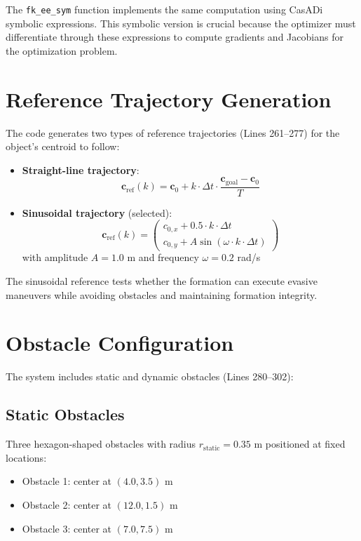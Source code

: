 \documentclass[12pt,a4paper]{article}
\begin{document}
The \texttt{fk\_ee\_sym} function implements the same computation using CasADi symbolic expressions. This symbolic version is crucial because the optimizer must differentiate through these expressions to compute gradients and Jacobians for the optimization problem.

\section{Reference Trajectory Generation}

The code generates two types of reference trajectories (Lines 261--277) for the object's centroid to follow:

\begin{itemize}
    \item \textbf{Straight-line trajectory}:
    \[
    \mathbf{c}_{\text{ref}}(k) = \mathbf{c}_0 + k \cdot \Delta t \cdot \frac{\mathbf{c}_{\text{goal}} - \mathbf{c}_0}{T}
    \]
    
    \item \textbf{Sinusoidal trajectory} (selected):
    \[
    \mathbf{c}_{\text{ref}}(k) = \begin{pmatrix} c_{0,x} + 0.5 \cdot k \cdot \Delta t \\ c_{0,y} + A \sin(\omega \cdot k \cdot \Delta t) \end{pmatrix}
    \]
    with amplitude $A = 1.0$ m and frequency $\omega = 0.2$ rad/s
\end{itemize}

The sinusoidal reference tests whether the formation can execute evasive maneuvers while avoiding obstacles and maintaining formation integrity.

\section{Obstacle Configuration}

The system includes static and dynamic obstacles (Lines 280--302):

\subsection{Static Obstacles}
Three hexagon-shaped obstacles with radius $r_{\text{static}} = 0.35$ m positioned at fixed locations:
\begin{itemize}
    \item Obstacle 1: center at $(4.0, 3.5)$ m
    \item Obstacle 2: center at $(12.0, 1.5)$ m
    \item Obstacle 3: center at $(7.0, 7.5)$ m
\end{itemize}
\end{document}

